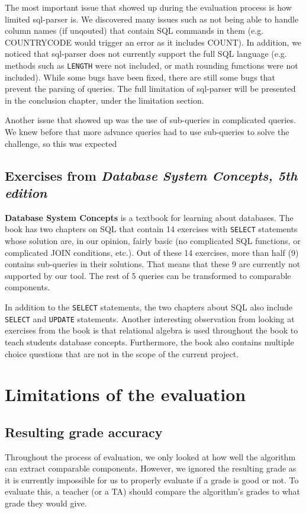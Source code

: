 The most important issue that showed up during the evaluation process is how limited sql-parser is. We discovered many issues such as not being able to handle column names (if unqouted) that contain SQL commands in them (e.g. COUNTRYCODE would trigger an error as it includes COUNT). In addition, we noticed that sql-parser does not currently support the full SQL language (e.g. methods such as \texttt{LENGTH} were not included, or math rounding functions were not included). While some bugs have been fixed, there are still some bugs that prevent the parsing of queries. The full limitation of sql-parser will be presented in the conclusion chapter, under the limitation section.

Another issue that showed up was the use of sub-queries in complicated queries. We knew before that more advance queries had to use sub-queries to solve the challenge, so this was expected

\subsection{Exercises from \textit{Database System Concepts, 5th edition}}

\textbf{Database System Concepts} is a textbook for learning about databases. The book has two chapters on SQL that contain 14 exercises with \texttt{SELECT} statements whose solution are, in our opinion, fairly basic (no complicated SQL functions, or complicated JOIN conditions, etc.). Out of these 14 exercises, more than half (9) contains sub-queries in their solutions. That means that these 9 are currently not supported by our tool. The rest of 5 queries can be transformed to comparable components.

In addition to the \texttt{SELECT} statements, the two chapters about SQL also include \texttt{SELECT} and \texttt{UPDATE} statements. Another interesting observation from looking at exercises from the book is that relational algebra is used throughout the book to teach students database concepts. Furthermore, the book also contains multiple choice questions that are not in the scope of the current project.

\section{Limitations of the evaluation}
\subsection{Resulting grade accuracy}
Throughout the process of evaluation, we only looked at how well the algorithm can extract comparable components. However, we ignored the resulting grade as it is currently impossible for us to properly evaluate if a grade is good or not. To evaluate this, a teacher (or a TA) should compare the algorithm's grades to what grade they would give.

